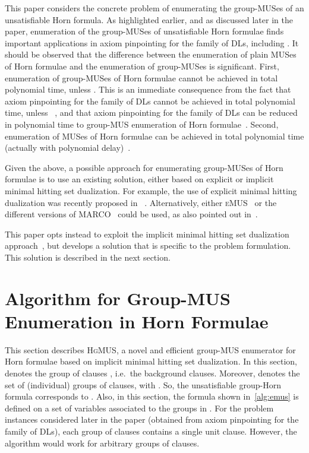 \documentclass{llncs}
\newcommand{\elplus}{\xspace}
\newcommand{\elplain}{\xspace}
\newcommand{\hgmus}{\textsc{HgMUS}\xspace}
\newcommand{\emus}{\textsc{eMUS}\xspace}
\begin{document}
This paper considers the concrete problem of enumerating the
group-MUSes of an unsatisfiable Horn formula. As highlighted earlier,
and as discussed later in the paper, enumeration of the group-MUSes of
unsatisfiable Horn formulae finds important applications in axiom
pinpointing for the \elplain family of DLs, including \elplus.
It should be observed that the difference between the enumeration of
plain MUSes of Horn formulae and the enumeration of group-MUSes is
significant.
First, enumeration of group-MUSes of Horn formulae cannot be achieved
in total polynomial time, unless . This is an
immediate consequence from the fact that axiom pinpointing for the
\elplain family of DLs cannot be achieved in total polynomial time,
unless ~\cite{baader-ki07}, and that axiom pinpointing
for the \elplain family of DLs can be reduced in polynomial time to
group-MUS enumeration of Horn formulae~\cite{ams-corr15}.
Second, enumeration of MUSes of Horn formulae can be achieved in total
polynomial time (actually with polynomial delay)~\cite{penaloza-kr10}.

Given the above, a possible approach for enumerating group-MUSes of
Horn formulae is to use an existing solution, either based on explicit
or implicit minimal hitting set dualization. For example, the use of
explicit minimal hitting dualization was recently proposed in ~\cite{ams-corr15}.
Alternatively, either \emus~\cite{pms-aaai13} or the different versions
of MARCO~\cite{liffiton-cpaior13,lpmms-cj15} could be used, as also
pointed out in~\cite{mp-tr15}.

This paper opts instead to exploit the implicit minimal hitting set
dualization approach~\cite{liffiton-cpaior13,pms-aaai13,lpmms-cj15},
but develops a solution that is specific to the problem formulation.
This solution is described in the next section.
 
 
 
\section{Algorithm for Group-MUS Enumeration in Horn Formulae}
\label{sec:hegmus}

This section describes \hgmus, a novel and efficient group-MUS
enumerator for Horn formulae based on implicit minimal hitting set
dualization.
In this section,  denotes the group of clauses ,
i.e.\ the background clauses. Moreover,  denotes the set of
(individual) groups of clauses, with
.
So, the unsatisfiable group-Horn formula corresponds to
.
Also, in this section, the formula  shown
in~\autoref{alg:emus} is defined on a set of variables associated to
the groups in .
For the problem instances considered
later in the paper (obtained from axiom pinpointing for the \elplain
family of DLs), each group of clauses contains a single unit clause.
However, the algorithm would work for arbitrary groups of clauses.
\end{document}
